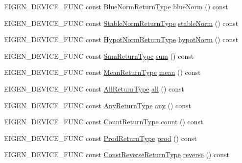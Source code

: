 \begin{DoxyCompactItemize}
\item 
E\+I\+G\+E\+N\+\_\+\+D\+E\+V\+I\+C\+E\+\_\+\+F\+U\+NC const \mbox{\hyperlink{class_eigen_1_1_partial_redux_expr}{Blue\+Norm\+Return\+Type}} \mbox{\hyperlink{class_eigen_1_1_vectorwise_op_ae1d431dae7e328e1e6d08d2fb5dc6c22}{blue\+Norm}} () const
\item 
E\+I\+G\+E\+N\+\_\+\+D\+E\+V\+I\+C\+E\+\_\+\+F\+U\+NC const \mbox{\hyperlink{class_eigen_1_1_partial_redux_expr}{Stable\+Norm\+Return\+Type}} \mbox{\hyperlink{class_eigen_1_1_vectorwise_op_adfa17a946f1bd845b85cba8cf34732ac}{stable\+Norm}} () const
\item 
E\+I\+G\+E\+N\+\_\+\+D\+E\+V\+I\+C\+E\+\_\+\+F\+U\+NC const \mbox{\hyperlink{class_eigen_1_1_partial_redux_expr}{Hypot\+Norm\+Return\+Type}} \mbox{\hyperlink{class_eigen_1_1_vectorwise_op_a9ae3feb2723628a3bcff6eabda2fa77d}{hypot\+Norm}} () const
\item 
E\+I\+G\+E\+N\+\_\+\+D\+E\+V\+I\+C\+E\+\_\+\+F\+U\+NC const \mbox{\hyperlink{class_eigen_1_1_partial_redux_expr}{Sum\+Return\+Type}} \mbox{\hyperlink{class_eigen_1_1_vectorwise_op_a2005154bdb90789c0eb55343be9694c1}{sum}} () const
\item 
E\+I\+G\+E\+N\+\_\+\+D\+E\+V\+I\+C\+E\+\_\+\+F\+U\+NC const \mbox{\hyperlink{class_eigen_1_1_partial_redux_expr}{Mean\+Return\+Type}} \mbox{\hyperlink{class_eigen_1_1_vectorwise_op_aea15d46c791ef6d17860fc8a61a5fbd6}{mean}} () const
\item 
E\+I\+G\+E\+N\+\_\+\+D\+E\+V\+I\+C\+E\+\_\+\+F\+U\+NC const \mbox{\hyperlink{class_eigen_1_1_partial_redux_expr}{All\+Return\+Type}} \mbox{\hyperlink{class_eigen_1_1_vectorwise_op_a2762ceabf1fecc22506ed304d0099f6c}{all}} () const
\item 
E\+I\+G\+E\+N\+\_\+\+D\+E\+V\+I\+C\+E\+\_\+\+F\+U\+NC const \mbox{\hyperlink{class_eigen_1_1_partial_redux_expr}{Any\+Return\+Type}} \mbox{\hyperlink{class_eigen_1_1_vectorwise_op_a7a513e04b7198f2fc565f636309337cc}{any}} () const
\item 
E\+I\+G\+E\+N\+\_\+\+D\+E\+V\+I\+C\+E\+\_\+\+F\+U\+NC const \mbox{\hyperlink{class_eigen_1_1_partial_redux_expr}{Count\+Return\+Type}} \mbox{\hyperlink{class_eigen_1_1_vectorwise_op_abf7ae4a00d195d06d46ad6c269d8508f}{count}} () const
\item 
E\+I\+G\+E\+N\+\_\+\+D\+E\+V\+I\+C\+E\+\_\+\+F\+U\+NC const \mbox{\hyperlink{class_eigen_1_1_partial_redux_expr}{Prod\+Return\+Type}} \mbox{\hyperlink{class_eigen_1_1_vectorwise_op_a6863499c3e7ea8635784376806abcf9f}{prod}} () const
\item 
E\+I\+G\+E\+N\+\_\+\+D\+E\+V\+I\+C\+E\+\_\+\+F\+U\+NC const \mbox{\hyperlink{class_eigen_1_1_reverse}{Const\+Reverse\+Return\+Type}} \mbox{\hyperlink{class_eigen_1_1_vectorwise_op_a058b821b65e2e27839853d9a25b0216c}{reverse}} () const

\end{DoxyCompactItemize}
